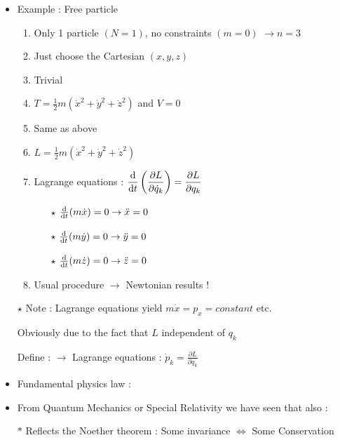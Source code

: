 \Tr
\begin{itemize}
\item Example : Free particle
\begin{enumerate}
\item Only 1 particle $(N=1)$, no constraints $(m=0)$ $\rightarrow n=3$
\item Just choose the Cartesian $(x,y,z)$
\item Trivial
\item $T=\frac{1}{2}m(\dot{x}^{2}+\dot{y}^{2}+\dot{z}^{2})$ and $V=0$
\item Same as above
\item $L=\frac{1}{2}m(\dot{x}^{2}+\dot{y}^{2}+\dot{z}^{2})$
\item Lagrange equations :
 {\blue $\displaystyle
 \frac{{\rm d}}{{\rm d}t} \left( \frac{\partial L}{\partial\dot{q}_{k}} \right)=
 \frac{\partial L}{\partial q_{k}}$}
\begin{itemize}
\item[$\star$] $\frac{\rm d}{{\rm d}t}(m\dot{x})=0 \rightarrow \ddot{x}=0$
\item[$\star$] $\frac{\rm d}{{\rm d}t}(m\dot{y})=0 \rightarrow \ddot{y}=0$
\item[$\star$] $\frac{\rm d}{{\rm d}t}(m\dot{z})=0 \rightarrow \ddot{z}=0$
\end{itemize}
\item Usual procedure $\rightarrow$ Newtonian results !
\end{enumerate}
\end{itemize}
%
\begin{itemize}
\item[$\star$] Note : Lagrange equations yield $m\dot{x}=p_{x}=constant$ etc.
\item[] Obviously due to the fact that $L$ independent of $q_{k}$
\end{itemize}
%
\begin{center}
{\red {}}
\end{center}
%
\begin{itemize}
\item[] Define : {\blue {}}
 $\rightarrow$ Lagrange equations : $\displaystyle  \dot{p}_{k}=\frac{\partial L}{\partial q_{k}}$
\item Fundamental physics law :
\end{itemize}
%
\begin{center}
{\red {}}
\end{center}
%
\begin{itemize}
\item From Quantum Mechanics or Special Relativity we have seen that also :
\end{itemize}
%
\begin{center}
{\red {}}
\end{center}
%
\begin{itemize}
\item[$\ast$] Reflects the Noether theorem : {\blue Some invariance $\Leftrightarrow$ Some Conservation}
\end{itemize}

